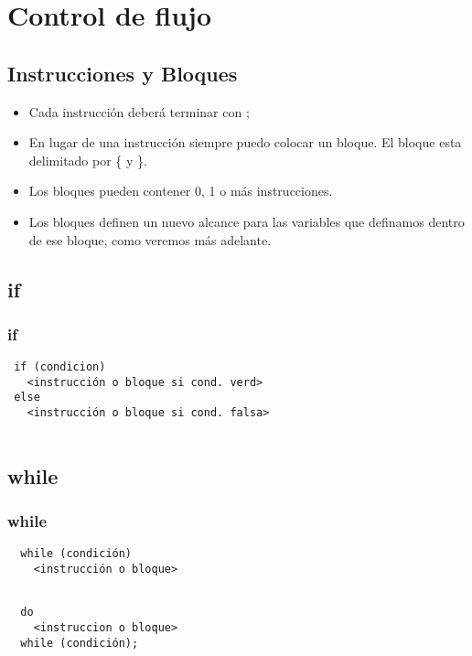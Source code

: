 \documentclass{beamer}
\begin{document}
% 
% 

\section{Control de flujo}

\subsection{Instrucciones y Bloques}
\begin{frame}
\begin{itemize}
 \item Cada instrucción deberá terminar con $;$
 \item En lugar de una instrucción siempre puedo colocar un bloque. El bloque esta delimitado por \{ y \}.
 \item Los bloques pueden contener 0, 1 o más instrucciones. 
 \item Los bloques definen un nuevo alcance para las variables que definamos dentro de ese bloque, como veremos más adelante.
\end{itemize}
\end{frame}

\subsection{if}
\begin{frame}[fragile]
\frametitle{if}

\begin{verbatim}
 if (condicion) 
   <instrucción o bloque si cond. verd>
 else 
   <instrucción o bloque si cond. falsa>
 
\end{verbatim}

\end{frame}

\subsection{while}
\begin{frame}[fragile]
\frametitle{while}

\begin{verbatim}
  while (condición) 
    <instrucción o bloque>
  
\end{verbatim}

\begin{verbatim}
  do 
    <instruccion o bloque>
  while (condición); 
\end{verbatim}

\end{frame}
\end{document}
